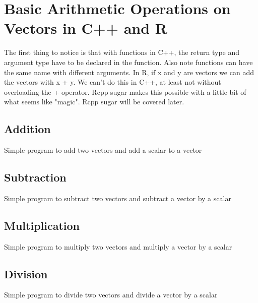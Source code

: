 \chapter{Basic Arithmetic Operations on Vectors in C++ and R}
The first thing to notice is that with functions in C++, the return type and argument type have to be declared in the function. Also note functions can have the same name with different arguments. In R, if x and y are vectors we can add the vectors with x + y. We can't do this in C++, at least not without overloading the + operator. Rcpp sugar makes this possible with a little bit of what seems like "magic". Rcpp sugar will be covered later.

\section{Addition}
Simple program to add two vectors and add a scalar to a vector

\lstset{language=C++}


\lstset{language=R}


\section{Subtraction}
Simple program to subtract two vectors and subtract a vector by a scalar

\lstset{language=C++}


\lstset{language=R}


\section{Multiplication}
Simple program to multiply two vectors and multiply a vector by a scalar

\lstset{language=C++}


\lstset{language=R}


\section{Division}
Simple program to divide two vectors and divide a vector by a scalar

\lstset{language=C++}


\lstset{language=R}
